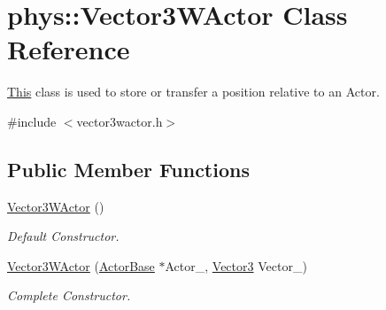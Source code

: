 \hypertarget{classphys_1_1Vector3WActor}{
\section{phys::Vector3WActor Class Reference}
\label{d2/de8/classphys_1_1Vector3WActor}
}


\hyperlink{structThis}{This} class is used to store or transfer a position relative to an Actor.  




{\ttfamily \#include $<$vector3wactor.h$>$}

\subsection*{Public Member Functions}
\begin{DoxyCompactItemize}
\item 
\hyperlink{classphys_1_1Vector3WActor_a910f3ee25e7f654e7ba3bedb9942c8f7}{Vector3WActor} ()
\begin{DoxyCompactList}\small\item\em Default Constructor. \item\end{DoxyCompactList}\item 
\hyperlink{classphys_1_1Vector3WActor_ac87c4c55b9260f47f56fb01b6f061ded}{Vector3WActor} (\hyperlink{classphys_1_1ActorBase}{ActorBase} $\ast$Actor\_\-, \hyperlink{classphys_1_1Vector3}{Vector3} Vector\_\-)
\begin{DoxyCompactList}\small\item\em Complete Constructor. \item\end{DoxyCompactList}\end{DoxyCompactItemize}

